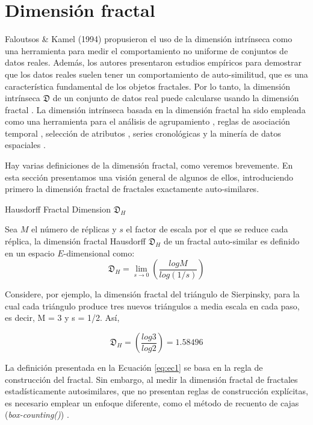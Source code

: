 \section{Dimensión fractal}

Faloutsos & Kamel (1994) \cite{conf/pods/FaloutsosK94} propusieron el uso de la dimensión intrínseca como una herramienta para medir el comportamiento no uniforme de conjuntos de datos reales. Además, los autores presentaron estudios empíricos para demostrar que los datos reales suelen tener un comportamiento de auto-similitud, que es  una   característica fundamental de los objetos fractales. Por lo tanto, la dimensión intrínseca $\mathfrak{D}$ de un conjunto de datos real puede calcularse usando la dimensión fractal \cite{journals/jidm/TrainaTWF10,DBLP:fractal2016}. La dimensión intrínseca basada en la dimensión fractal ha sido empleada como una herramienta para el análisis de agrupamiento \cite{Barbara2003},  reglas de asociación temporal \cite{Barbara2004}, selección de atributos \cite{journals/jidm/TrainaTF10}, series cronológicas \cite{Chakrabarti:2002:FLA:584792.584797} y la minería de datos espaciales \cite{Traina:2001:TST:502512.502538}.
 
Hay varias definiciones de la dimensión fractal, como veremos brevemente. En esta sección presentamos una visión general de algunos de ellos, introduciendo primero la dimensión fractal de fractales exactamente auto-similares.

\begin{definition}{Hausdorff Fractal Dimension $\mathfrak{D}_H$}
	
 Sea $M$ el número de réplicas y $s$ el factor de  escala
 por el que se reduce cada réplica, la dimensión fractal Hausdorff $\mathfrak{D}_H$ de un fractal auto-similar es   definido en un espacio $E$-dimensional como:
\begin{equation}
\mathfrak{D}_H = \lim_{s \to 0} (\frac{log M}{log (1/s)})
\label{eq:ec1}
\end{equation}

\end{definition}

Considere, por ejemplo, la dimensión fractal del triángulo de Sierpinsky, para la cual cada triángulo produce tres nuevos triángulos a media escala en cada paso, es decir, M = 3 y s = 1/2. Así,

$$	\mathfrak{D}_H = (\frac{log 3}{log 2}) = 1.58496  $$

La definición presentada en la Ecuación \ref{eq:ec1} se basa en la regla de construcción del fractal. Sin embargo, al medir la dimensión fractal de fractales estadísticamente autosimilares, que no presentan reglas de construcción explícitas, es necesario emplear un enfoque diferente, como el método de recuento de cajas (\textit{box-counting()}) \cite{journals/jidm/TrainaTF10}.
 

